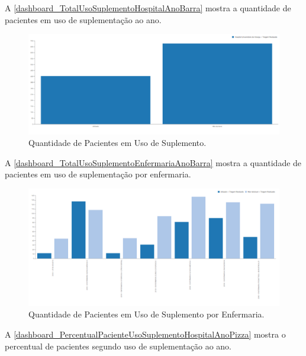 \newpage
A \autoref{dashboard_TotalUsoSuplementoHospitalAnoBarra} mostra a quantidade de pacientes em uso de suplementação ao ano.

\begin{figure}[htb]
	\caption{\label{dashboard_TotalUsoSuplementoHospitalAnoBarra}Quantidade de Pacientes em Uso de Suplemento.}
	\begin{center}
	    \includegraphics[scale=0.57]{Imagens/5.1.TotalUsoSuplementoHospitalAnoBarra.png}
	\end{center}
\end{figure}

A \autoref{dashboard_TotalUsoSuplementoEnfermariaAnoBarra} mostra a quantidade de pacientes em uso de suplementação por enfermaria.

\begin{figure}[htb]
	\caption{\label{dashboard_TotalUsoSuplementoEnfermariaAnoBarra}Quantidade de Pacientes em Uso de Suplemento por Enfermaria.}
	\begin{center}
	    \includegraphics[scale=0.55]{Imagens/5.2.TotalUsoSuplementoEnfermariaAnoBarra.png}
	\end{center}
\end{figure}

\newpage
A \autoref{dashboard_PercentualPacienteUsoSuplementoHospitalAnoPizza} mostra o percentual de pacientes segundo uso de suplementação ao ano.

